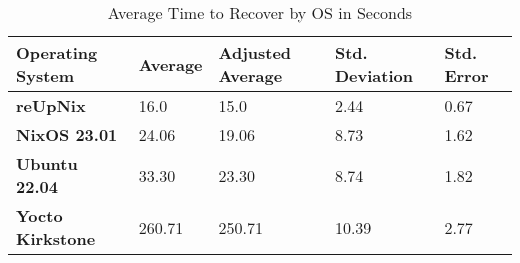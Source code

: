 \begin{table}[H]
	\centering
	\begin{tabular}{l|l|l|l|l}
	\toprule
		Operating System & Average & Adjusted Average\footnote &  Std. Deviation & Std. Error \\
	\midrule
    \textbf{reUpNix} & 16.0 & 15.0 &  2.44 & 0.67 \\
    \textbf{NixOS 23.01} & 24.06 & 19.06 & 8.73 & 1.62 \\
    \textbf{Ubuntu 22.04} & 33.30 & 23.30 & 8.74 & 1.82 \\
    \textbf{Yocto Kirkstone} & 260.71 & 250.71 & 10.39  & 2.77 \\
	\bottomrule
	\end{tabular}
	\caption{Average Time to Recover by OS in Seconds}
	\label{tab:timetorecover}
\end{table}

